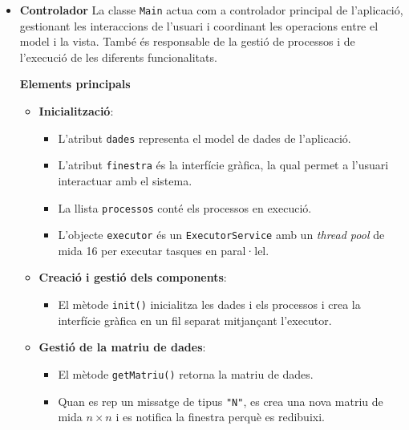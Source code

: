 \documentclass{ieeetj}
\begin{document}
\begin{itemize}
\item\textbf{Controlador}
La classe \texttt{Main} actua com a controlador principal de l'aplicació, gestionant les interaccions de l'usuari i coordinant les operacions entre el model i la vista. També és responsable de la gestió de processos i de l'execució de les diferents funcionalitats.

\textbf{Elements principals}
\begin{itemize}
    \item \textbf{Inicialització}: 
    \begin{itemize}
        \item L'atribut \texttt{dades} representa el model de dades de l'aplicació.
        \item L'atribut \texttt{finestra} és la interfície gràfica, la qual permet a l'usuari interactuar amb el sistema.
        \item La llista \texttt{processos} conté els processos en execució.
        \item L'objecte \texttt{executor} és un \texttt{ExecutorService} amb un \textit{thread pool} de mida 16 per executar tasques en paral·lel.
    \end{itemize}
    
    \item \textbf{Creació i gestió dels components}:
    \begin{itemize}
        \item El mètode \texttt{init()} inicialitza les dades i els processos i crea la interfície gràfica en un fil separat mitjançant l'executor.
    \end{itemize}
    
    \item \textbf{Gestió de la matriu de dades}:
    \begin{itemize}
        \item El mètode \texttt{getMatriu()} retorna la matriu de dades.
        \item Quan es rep un missatge de tipus \texttt{"N"}, es crea una nova matriu de mida \(n \times n\) i es notifica la finestra perquè es redibuixi.
    \end{itemize}
    

\end{itemize}
\end{itemize}
\end{document}
